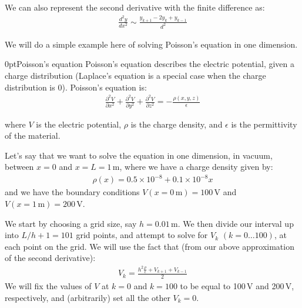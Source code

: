 We can also represent the second derivative with the finite difference as:
\begin{align}
 \frac{d^2y}{dx^2} \sim \frac{y_{k+1}-2y_k+y_{k-1}}{d^2} 
\end{align}

We will do a simple example here of solving Poisson's equation in one dimension.

\begin{example}{0pt}{Poisson's equation}{}
Poisson's equation describes the electric potential, given a charge distribution (Laplace's equation is a special case when the charge distribution is 0). Poisson's equation is:
\begin{align*}
\frac{\partial^2V}{\partial x^2}+\frac{\partial^2V}{\partial y^2}+\frac{\partial^2V}{\partial z^2}=-\frac{\rho(x,y,z)}{\epsilon} 
\end{align*}

where $V$ is the electric potential, $\rho$ is the charge density, and $\epsilon$ is the permittivity of the material.

Let's say that we want to solve the equation in one dimension, in vacuum, between $x=0$ and $x=L=1$\,m, where we have a charge density given by:
\begin{align*}
 \rho(x) = 0.5\times 10^{-8}+0.1\times 10^{-8}x 
\end{align*}
and we have the boundary conditions $V(x=0\,\mathrm{m})=100$\,V and $V(x=1\,\mathrm{m})=200$\,V.

We start by choosing a grid size, say $h=0.01$\,m. We then divide our interval up into $L/h+1=101$ grid points, and attempt to solve for $V_k$ $(k=0\dots 100)$, at each point on the grid. We will use the fact that (from our above approximation of the second derivative):
\begin{align*}
 V_k = \frac{h^2\frac{\rho}{\epsilon}+V_{k+1}+V_{k-1}}{2} 
\end{align*}
We will fix the values of $V$ at $k=0$ and $k=100$ to be equal to 100\,V and 200\,V, respectively, and (arbitrarily) set all the other $V_k = 0$.


\end{example}
